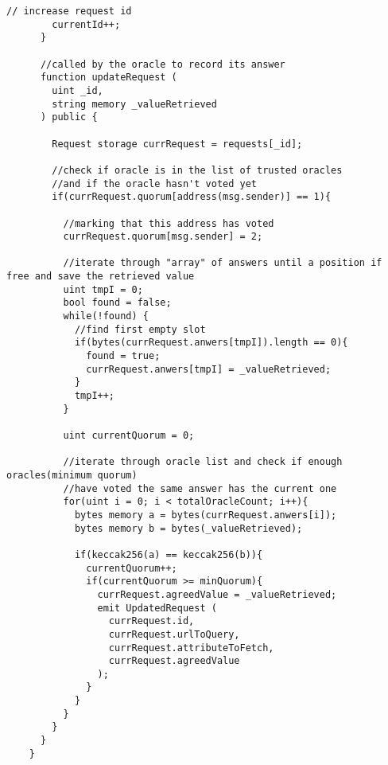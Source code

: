 \begin{lstlisting}[language=Solidity]
        // increase request id
        currentId++;
      }

      //called by the oracle to record its answer
      function updateRequest (
        uint _id,
        string memory _valueRetrieved
      ) public {

        Request storage currRequest = requests[_id];

        //check if oracle is in the list of trusted oracles
        //and if the oracle hasn't voted yet
        if(currRequest.quorum[address(msg.sender)] == 1){

          //marking that this address has voted
          currRequest.quorum[msg.sender] = 2;

          //iterate through "array" of answers until a position if free and save the retrieved value
          uint tmpI = 0;
          bool found = false;
          while(!found) {
            //find first empty slot
            if(bytes(currRequest.anwers[tmpI]).length == 0){
              found = true;
              currRequest.anwers[tmpI] = _valueRetrieved;
            }
            tmpI++;
          }

          uint currentQuorum = 0;

          //iterate through oracle list and check if enough oracles(minimum quorum)
          //have voted the same answer has the current one
          for(uint i = 0; i < totalOracleCount; i++){
            bytes memory a = bytes(currRequest.anwers[i]);
            bytes memory b = bytes(_valueRetrieved);

            if(keccak256(a) == keccak256(b)){
              currentQuorum++;
              if(currentQuorum >= minQuorum){
                currRequest.agreedValue = _valueRetrieved;
                emit UpdatedRequest (
                  currRequest.id,
                  currRequest.urlToQuery,
                  currRequest.attributeToFetch,
                  currRequest.agreedValue
                );
              }
            }
          }
        }
      }
    }



\end{lstlisting}

